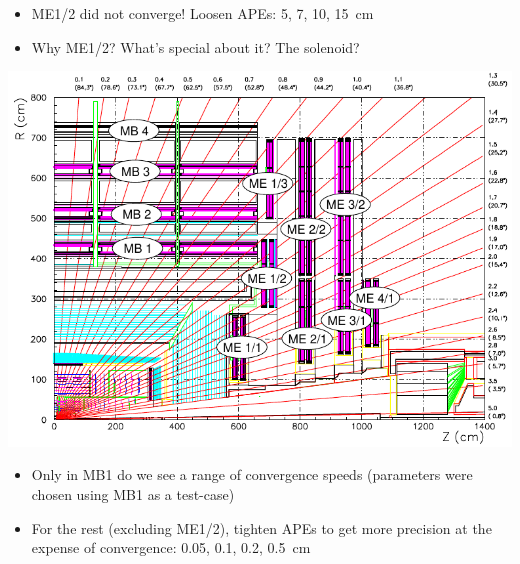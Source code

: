 \documentclass[compress]{beamer}
\begin{document}
\begin{frame}
\begin{itemize}
\item ME1/2 did not converge!  Loosen APEs: 5, 7, 10, 15~cm
\item Why ME1/2?  What's special about it?  The solenoid?
\end{itemize}

\vspace{-0.25 cm}
\begin{center}
\includegraphics[width=0.6\linewidth]{muon_system_labeled.pdf}
\end{center}

\vspace{-0.5 cm}
\begin{itemize}
\item Only in MB1 do we see a range of convergence speeds (parameters
were chosen using MB1 as a test-case)
\item For the rest (excluding ME1/2), tighten APEs to get more
precision at the expense of convergence: 0.05, 0.1, 0.2, 0.5~cm
\end{itemize}
\end{frame}
\end{document}
